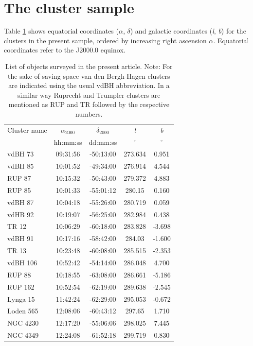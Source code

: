 \documentclass[draft]{aa}
\begin{document}
\section{The cluster sample}
\label{sec:clust_sample}

Table \ref{tab:clust_list} shows equatorial coordinates ($\alpha$, $\delta$) and
galactic coordinates (\textit{l}, \textit{b}) for the clusters in the present
sample, ordered by increasing right ascension $\alpha$. Equatorial coordinates
refer to the J2000.0 equinox.

\begin{table}[ht]
    \centering
    \begin{tabular}{lcccc}
    \hline 
        Cluster name & $\alpha_{2000}$ & $\delta_{2000}$ & \emph{l} & \emph{b}\\
         & hh:mm:ss & dd:mm:ss & $^\circ$ & $^\circ$\\
       \hline \hline 
        vdBH 73 & 09:31:56 & -50:13:00 & 273.634 & 0.951\\
        vdBH 85 & 10:01:52 & -49:34:00 & 276.914 & 4.544\\
        RUP 87 & 10:15:32 & -50:43:00 & 279.372 & 4.883\\
        RUP 85 & 10:01:33 & -55:01:12 & 280.15 & 0.160\\
        vdBH 87 & 10:04:18 & -55:26:00 & 280.719 & 0.059\\
        vdHB 92 & 10:19:07 & -56:25:00 & 282.984 & 0.438\\
        TR 12 & 10:06:29 & -60:18:00 & 283.828 & -3.698\\
        vdBH 91 & 10:17:16 & -58:42:00 & 284.03 & -1.600\\
        TR 13 & 10:23:48 & -60:08:00 & 285.515 & -2.353\\
        vdBH 106 & 10:52:42 & -54:14:00 & 286.048 & 4.700\\
        RUP 88 & 10:18:55 & -63:08:00 & 286.661 & -5.186\\
        RUP 162 & 10:52:54 & -62:19:00 & 289.638 & -2.545\\
        Lynga 15 & 11:42:24 & -62:29:00 & 295.053 & -0.672\\
        Loden 565 & 12:08:06 & -60:43:12 & 297.65 & 1.710\\
        NGC 4230 & 12:17:20 & -55:06:06 & 298.025 & 7.445\\
        NGC 4349 & 12:24:08 & -61:52:18 & 299.719 & 0.830\\
        \hline
    \end{tabular}
    \caption{List of objects surveyed in the present article.
    Note: For the sake of saving space van den Bergh-Hagen clusters are
    indicated using the usual vdBH abbreviation. In a similar
    way Ruprecht and Trumpler clusters are mentioned as RUP and TR followed
    by the respective numbers.}
    \label{tab:clust_list}
\end{table}
\end{document}
